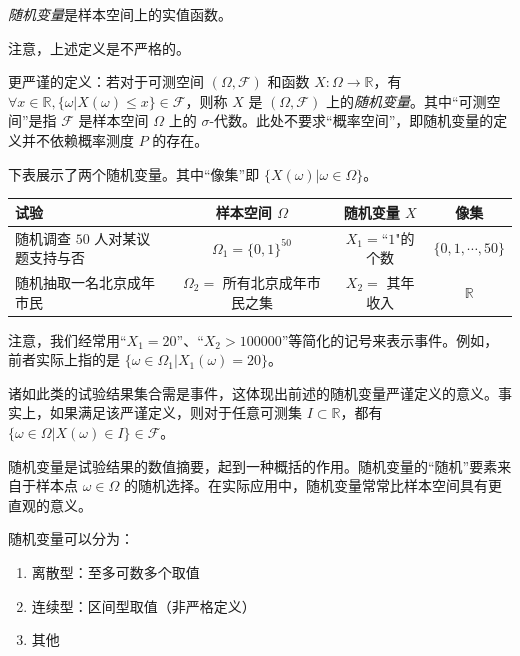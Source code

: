 \documentclass[../main.tex]{subfiles}
\begin{document}
\begin{definition}\label{def:2.1.1}
  \emph{随机变量}是样本空间上的实值函数。
\end{definition}

注意，上述定义是不严格的。

更严谨的定义：若对于可测空间 $(\Omega,\mathcal{F})$ 和函数 $X:\Omega\rightarrow\mathbb{R}$，有 $\forall x\in \mathbb{R},\{\omega|X(\omega)\leq x\}\in\mathcal{F}$，则称 $X$ 是 $(\Omega,\mathcal{F})$ 上的\emph{随机变量}。其中“可测空间”是指 $\mathcal{F}$ 是样本空间 $\Omega$ 上的 $\sigma$-代数。此处不要求“概率空间”，即随机变量的定义并不依赖概率测度 $P$ 的存在。

\begin{example}
  下表展示了两个随机变量。其中“像集”即 $\{X(\omega)|\omega\in\Omega\}$。

  \bigskip
  \begin{tabular}{|>{\centering\arraybackslash}m{3.2cm}|c|c|c|}
    \hline
    试验                             & 样本空间 $\Omega$                & 随机变量 $X$      & 像集                \\
    \hline
    随机调查 $50$ 人对某议题支持与否 & $\Omega_1=\{0,1\}^{50}$          & $X_1=$“$1$"的个数 & $\{0,1,\cdots,50\}$ \\
    \hline
    随机抽取一名北京成年市民         & $\Omega_2=$ 所有北京成年市民之集 & $X_2=$ 其年收入   & $\mathbb{R}$        \\
    \hline
  \end{tabular}
\end{example}

注意，我们经常用“$X_1=20$”、“$X_2>100000$”等简化的记号来表示事件。例如，前者实际上指的是 $\{\omega\in\Omega_1|X_1(\omega)=20\}$。

诸如此类的试验结果集合需是事件，这体现出前述的随机变量严谨定义的意义。事实上，如果满足该严谨定义，则对于任意可测集 $I\subset \mathbb{R}$，都有 $\{\omega\in\Omega|X(\omega)\in I\}\in\mathcal{F}$。

随机变量是试验结果的数值摘要，起到一种概括的作用。随机变量的“随机”要素来自于样本点 $\omega\in\Omega$ 的随机选择。在实际应用中，随机变量常常比样本空间具有更直观的意义。

随机变量可以分为：
\begin{enumerate}
  \item 离散型：至多可数多个取值
  \item 连续型：区间型取值（非严格定义）
  \item 其他
\end{enumerate}
\end{document}
